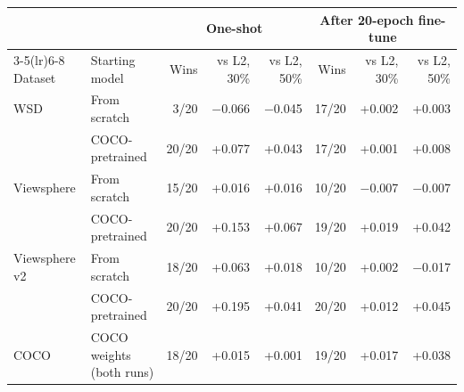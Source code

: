 \begin{tabular}{llrrrrrr}
\toprule
 & & \multicolumn{3}{c}{One-shot} & \multicolumn{3}{c}{After 20-epoch fine-tune} \\
\cmidrule(lr){3-5}\cmidrule(lr){6-8}
Dataset & Starting model & Wins & vs L2, 30\% & vs L2, 50\% & Wins & vs L2, 30\% & vs L2, 50\% \\
\midrule
WSD & From scratch & 3/20 & $-$0.066 & $-$0.045 & 17/20 & +0.002 & +0.003 \\
 & COCO-pretrained & 20/20 & +0.077 & +0.043 & 17/20 & +0.001 & +0.008 \\
\midrule
Viewsphere & From scratch & 15/20 & +0.016 & +0.016 & 10/20 & $-$0.007 & $-$0.007 \\
 & COCO-pretrained & 20/20 & +0.153 & +0.067 & 19/20 & +0.019 & +0.042 \\
\midrule
Viewsphere v2 & From scratch & 18/20 & +0.063 & +0.018 & 10/20 & +0.002 & $-$0.017 \\
 & COCO-pretrained & 20/20 & +0.195 & +0.041 & 20/20 & +0.012 & +0.045 \\
\midrule
COCO & COCO weights (both runs) & 18/20 & +0.015 & +0.001 & 19/20 & +0.017 & +0.038 \\
\bottomrule
\end{tabular}
